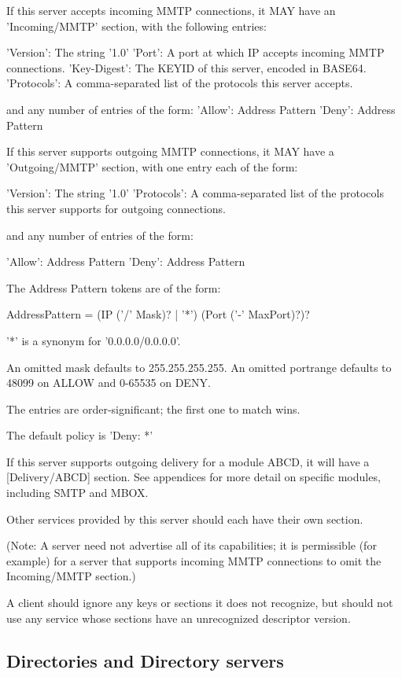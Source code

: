 If this server accepts incoming MMTP connections, it MAY have an
'Incoming/MMTP' section, with the following entries:

     'Version': The string '1.0'
     'Port': A port at which IP accepts incoming MMTP connections.
     'Key-Digest': The KEYID of this server, encoded in BASE64.
     'Protocols': A comma-separated list of the protocols this
           server accepts.

and any number of entries of the form:
     'Allow': Address Pattern
     'Deny': Address Pattern

If this server supports outgoing MMTP connections, it MAY have a
'Outgoing/MMTP' section, with one entry each of the form:

      'Version': The string '1.0'
      'Protocols': A comma-separated list of the protocols this server
           supports for outgoing connections.

and any number of entries of the form:

      'Allow': Address Pattern
      'Deny': Address Pattern

The Address Pattern tokens are of the form:

   AddressPattern = (IP ('/' Mask)? | '*') (Port ('-' MaxPort)?)?

'*' is a synonym for '0.0.0.0/0.0.0.0'.

An omitted mask defaults to 255.255.255.255.  An omitted portrange
defaults to 48099 on ALLOW and 0-65535 on DENY.

The entries are order-significant; the first one to match wins.

The default policy is 'Deny: *'

If this server supports outgoing delivery for a module ABCD, it will
have a [Delivery/ABCD] section.  See appendices for more detail on
specific modules, including SMTP and MBOX.

Other services provided by this server should each have their own section.

(Note: A server need not advertise all of its capabilities; it is
permissible (for example) for a server that supports incoming MMTP
connections to omit the Incoming/MMTP section.)

A client should ignore any keys or sections it does not recognize, but
should not use any service whose sections have an unrecognized
descriptor version.

\subsection{Directories and Directory servers}

